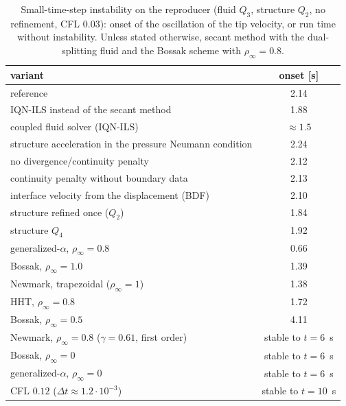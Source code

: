 \documentclass[11pt,a4paper]{article}
\theoremstyle{definition}
\theoremstyle{remark}
\begin{document}
\begin{table}[ht]\centering
\caption{Small-time-step instability on the reproducer (fluid $Q_3$, structure $Q_2$, no
refinement, CFL $0.03$): onset of the oscillation of the tip velocity, or run time without
instability. Unless stated otherwise, secant method with the dual-splitting fluid and the Bossak
scheme with $\rho_\infty=0.8$.}\label{tab:instability}
\begin{tabular}{lc}
\toprule
variant & onset [s]\\
\midrule
reference & 2.14\\
IQN-ILS instead of the secant method & 1.88\\
coupled fluid solver (IQN-ILS) & $\approx1.5$\\
structure acceleration in the pressure Neumann condition & 2.24\\
no divergence/continuity penalty & 2.12\\
continuity penalty without boundary data & 2.13\\
interface velocity from the displacement (BDF) & 2.10\\
structure refined once ($Q_2$) & 1.84\\
structure $Q_4$ & 1.92\\
\midrule
generalized-$\alpha$, $\rho_\infty=0.8$ & 0.66\\
Bossak, $\rho_\infty=1.0$ & 1.39\\
Newmark, trapezoidal ($\rho_\infty=1$) & 1.38\\
HHT, $\rho_\infty=0.8$ & 1.72\\
Bossak, $\rho_\infty=0.5$ & 4.11\\
Newmark, $\rho_\infty=0.8$ ($\gamma=0.61$, first order) & stable to $t=6$~s\\
Bossak, $\rho_\infty=0$ & stable to $t=6$~s\\
generalized-$\alpha$, $\rho_\infty=0$ & stable to $t=6$~s\\
\midrule
CFL $0.12$ ($\Delta t\approx1.2\cdot10^{-3}$) & stable to $t=10$~s\\
\bottomrule
\end{tabular}
\end{table}
\end{document}
